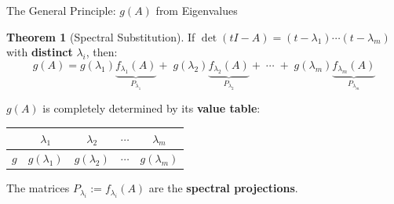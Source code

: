 \documentclass[10pt]{beamer}
\theoremstyle{definition}
\newtheorem{thm}{Theorem}[section]
\newcommand{\x}[1]{\alert{\textbf{#1}}}
\begin{document}
%
\begin{frame}{The General Principle: $g(A)$ from Eigenvalues}

\begin{thm}[Spectral Substitution]
If $\det(tI - A) = (t-\lambda_1)\cdots(t-\lambda_m)$ with \x{distinct} $\lambda_i$, then:
$$g(A) = g(\lambda_1)\!\underbrace{f_{\lambda_1}(A)}_{P_{\lambda_1}}\! + \; g(\lambda_2)\!\underbrace{f_{\lambda_2}(A)}_{P_{\lambda_2}} + \;\cdots\; + \; g(\lambda_m)\!\underbrace{f_{\lambda_m}(A)}_{P_{\lambda_m}}$$
\end{thm}

\vfill

$g(A)$ is completely determined by its \x{value table}:

\begin{center}
\renewcommand{\arraystretch}{1.3}
\begin{tabular}{c|cccc}
 & $\lambda_1$ & $\lambda_2$ & $\cdots$ & $\lambda_m$ \\
\hline
$g$ & $g(\lambda_1)$ & $g(\lambda_2)$ & $\cdots$ & $g(\lambda_m)$
\end{tabular}
\end{center}

\vfill

The matrices $P_{\lambda_i} := f_{\lambda_i}(A)$ are the \x{spectral projections}.

\end{frame}
\end{document}
